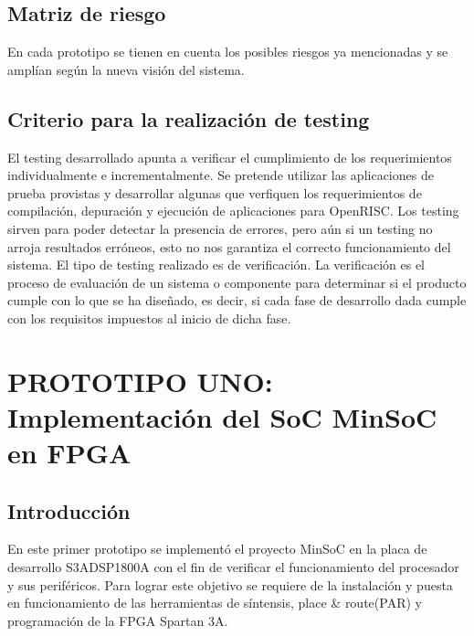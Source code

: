 		\subsection{Matriz de riesgo}
En cada prototipo se tienen en cuenta los posibles riesgos ya mencionadas y se amplían según la nueva visión del sistema.
		
		\subsection{Criterio para la realización de testing}%
		El testing desarrollado apunta a verificar el cumplimiento de los requerimientos individualmente e incrementalmente. Se pretende utilizar las
		aplicaciones de prueba provistas y desarrollar algunas que verfiquen los requerimientos de compilación, depuración y ejecución de aplicaciones para
		OpenRISC. 
		Los testing sirven para poder detectar la presencia de errores, pero aún si un testing no arroja resultados erróneos, esto no nos garantiza el
		correcto funcionamiento del sistema. El tipo de testing realizado es de verificación. La verificación es el proceso de evaluación de un sistema o
		componente para determinar si el producto cumple con lo que se ha diseñado, es decir, si cada fase de desarrollo dada cumple con los requisitos
		impuestos al inicio de dicha fase.

	\newpage
	\section{PROTOTIPO UNO: Implementación del SoC MinSoC en FPGA}
		\subsection{Introducción}
		
	En este primer prototipo se implementó el proyecto MinSoC en la placa de desarrollo S3ADSP1800A con el fin de verificar el funcionamiento del procesador y sus periféricos. Para lograr este objetivo se requiere de la instalación y puesta en funcionamiento de las herramientas de síntensis, place \& route(PAR) y programación de la FPGA Spartan 3A. 

